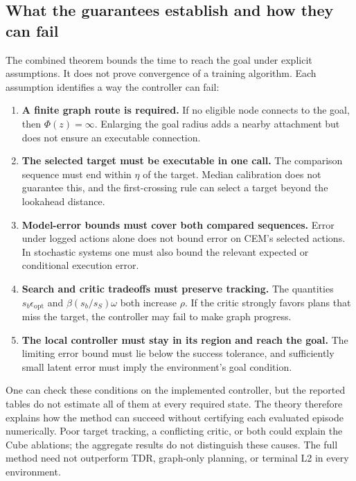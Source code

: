 \documentclass{article}
\theoremstyle{definition}
\theoremstyle{remark}
\begin{document}
\subsection{What the guarantees establish and how they can fail}
\label{app:theory-scope}
The combined theorem bounds the time to reach the goal under explicit assumptions.
It does not prove convergence of a training algorithm. Each assumption identifies
a way the controller can fail:
\begin{enumerate}[leftmargin=*,itemsep=3pt]
 \item \textbf{A finite graph route is required.}
       If no eligible node connects to the goal, then $\Phi(z)=\infty$.
       Enlarging the goal radius adds a nearby attachment but does not ensure an executable connection.
 \item \textbf{The selected target must be executable in one call.}
       The comparison sequence must end within $\eta$ of the target. Median calibration
       does not guarantee this, and the first-crossing rule can select a target beyond the lookahead distance.
 \item \textbf{Model-error bounds must cover both compared sequences.}
       Error under logged actions alone does not bound error on CEM's selected actions.
       In stochastic systems one must also bound the relevant expected or conditional execution error.
 \item \textbf{Search and critic tradeoffs must preserve tracking.}
       The quantities $s_b\epsilon_{\mathrm{opt}}$ and
       $\beta(s_b/s_S)\omega$ both increase $\rho$. If the critic strongly favors plans
       that miss the target, the controller may fail to make graph progress.
 \item \textbf{The local controller must stay in its region and reach the goal.}
       The limiting error bound must lie below the success tolerance, and sufficiently
       small latent error must imply the environment's goal condition.
\end{enumerate}

One can check these conditions on the implemented controller, but the reported tables
do not estimate all of them at every required state. The theory therefore explains
how the method can succeed without certifying each evaluated episode numerically.
Poor target tracking, a conflicting critic, or both could explain the Cube ablations;
the aggregate results do not distinguish these causes. The full method need not
outperform TDR, graph-only planning, or terminal L2 in every environment.
\end{document}
